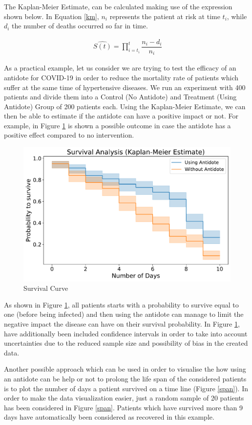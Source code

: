 The Kaplan-Meier Estimate, can be calculated making use of the expression shown below. In Equation \ref{km}, $n_{i}$ represents the patient at risk at time $t_{i}$, while $d_{i}$ the number of deaths occurred so far in time.

\useshortskip
\begin{align}
\ \widehat{S(t)} = \prod_{i=t_{i}}^{t} \dfrac{n_{i}-d_{i}}{n_{i}}
\label{km}
\end{align}
\useshortskip

As a practical example, let us consider we are trying to test the efficacy of an antidote for COVID-19 in order to reduce the mortality rate of patients which suffer at the same time of hypertensive diseases. We run an experiment with 400 patients and divide them into a Control (No Antidote) and Treatment (Using Antidote) Group of 200 patients each. Using the Kaplan-Meier Estimate, we can then be able to estimate if the antidote can have a positive impact or not. For example, in Figure \ref{s_curve} is shown a possible outcome in case the antidote has a positive effect compared to no intervention.

\begin{figure}[ht!]%
    \centering
    \includegraphics[width=0.55\linewidth]{latex/images/survival.pdf}
    \vspace{-0.2cm}
    \caption{Survival Curve}
    \label{s_curve}
\end{figure}

As shown in Figure \ref{s_curve}, all patients starts with a probability to survive equal to one (before being infected) and then using the antidote can manage to limit the negative impact the disease can have on their survival probability. In Figure \ref{s_curve}, have additionally been included confidence intervals in order to take into account uncertainties due to the reduced sample size and possibility of bias in the created data.

Another possible approach which can be used in order to visualise the how using an antidote can be help or not to prolong the life span of the considered patients is to plot the number of days a patient survived on a time line (Figure \ref{span}). In order to make the data visualization easier, just a random sample of 20 patients has been considered in Figure \ref{span}. Patients which have survived more than 9 days have automatically been considered as recovered in this example.

